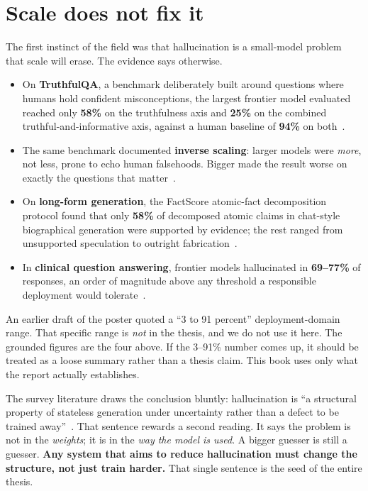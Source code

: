 \section{Scale does not fix it}

The first instinct of the field was that hallucination is a small-model problem
that scale will erase. The evidence says otherwise.

\begin{itemize}[leftmargin=1.4em]
  \item On \textbf{TruthfulQA}, a benchmark deliberately built around questions
  where humans hold confident misconceptions, the largest frontier model
  evaluated reached only \textbf{58\%} on the truthfulness axis and \textbf{25\%}
  on the combined truthful-and-informative axis, against a human baseline of
  \textbf{94\%} on both~\cite{lin-etal-2022-truthfulqa}.
  \item The same benchmark documented \textbf{inverse scaling}: larger models
  were \emph{more}, not less, prone to echo human falsehoods. Bigger made the
  result worse on exactly the questions that matter~\cite{lin-etal-2022-truthfulqa}.
  \item On \textbf{long-form generation}, the FactScore atomic-fact decomposition
  protocol found that only \textbf{58\%} of decomposed atomic claims in
  chat-style biographical generation were supported by evidence; the rest ranged
  from unsupported speculation to outright fabrication~\cite{min-etal-2023-factscore}.
  \item In \textbf{clinical question answering}, frontier models hallucinated in
  \textbf{69--77\%} of responses, an order of magnitude above any threshold a
  responsible deployment would tolerate~\cite{alkaissi2023artificial}.
\end{itemize}

\begin{pitfall}
An earlier draft of the poster quoted a ``3 to 91 percent'' deployment-domain
range. That specific range is \emph{not} in the thesis, and we do not use it
here. The grounded figures are the four above. If the 3--91\% number comes up,
it should be treated as a loose summary rather than a thesis claim. This book
uses only what the report actually establishes.
\end{pitfall}

The survey literature draws the conclusion bluntly: hallucination is
``a structural property of stateless generation under uncertainty rather than a
defect to be trained away''~\cite{ji2023survey,huang-etal-2023-large}. That
sentence rewards a second reading. It says the problem is not in the
\emph{weights}; it is in the \emph{way the model is used}. A bigger guesser is
still a guesser. \textbf{Any system that aims to reduce hallucination must
change the structure, not just train harder.} That single sentence is the seed
of the entire thesis.

